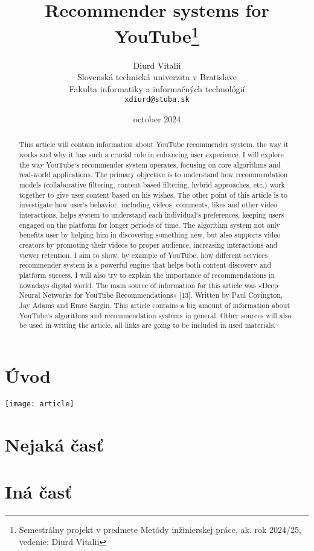 \documentclass[10pt,twoside,slovak,a4paper]{coursepaper}
\title{Recommender systems for YouTube\thanks{Semestrálny projekt v predmete Metódy inžinierskej práce, ak. rok 2024/25, vedenie: Diurd Vitalii}}
\author{Diurd Vitalii\\[2pt]
	{\small Slovenská technická univerzita v Bratislave}\\
	{\small Fakulta informatiky a informačných technológií}\\
	{\small \texttt{xdiurd@stuba.sk}}
	}
\date{\small october 2024} %
\begin{document}
\maketitle

\begin{abstract}
This article will contain information about YouTube recommender system, the way it works and why it has such a crucial role in enhancing user experience. I will explore the way YouTube`s recommender system operates, focusing on core algorithms and real-world applications. The primary objective is to understand how recommendation models (collaborative filtering, content-based filtering, hybrid approaches, etc.) work together to give user content based on his wishes. The other point of this article is to investigate how user`s behavior, including videos, comments, likes and other video interactions, helps system to understand each individual`s preferences, keeping users engaged on the platform for longer periods of time. The algorithm system not only benefits user by helping him in discovering something new, but also supports video creators by promoting their videos to proper audience, increasing interactions and viewer retention. I aim to show, by example of YouTube,   how different services recommender system is a powerful engine that helps both content discovery and platform success. I will also try to explain the importance of recommendations in nowadays digital world. The main source of information for this article was «Deep Neural Networks for YouTube Recommendations» [13].  Written by Paul Covington, Jay Adams and Emre Sargin. This article contains a big amount of information about YouTube`s algorithms and recommendation systems in general. Other sources will also be used in writing the article, all links are going to be included in used materials.
\end{abstract}



\section{Úvod}
\texttt{[image: article]}
\section{Nejaká časť} \label{nejaka}



\section{Iná časť} \label{ina}
\end{document}
